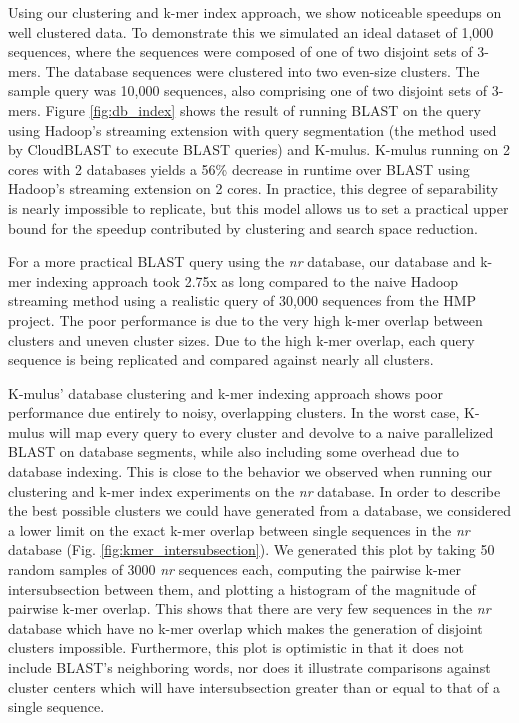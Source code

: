 Using our clustering and k-mer index approach, we show noticeable speedups on well clustered data.
To demonstrate this we simulated an ideal dataset of 1,000 sequences, where the sequences were composed of one of two disjoint sets of 3-mers.
The database sequences were clustered into two even-size clusters.
The sample query was 10,000 sequences, also comprising one of two disjoint sets of 3-mers.
Figure \ref{fig:db_index} shows the result of running BLAST on the query using Hadoop's streaming extension with query segmentation (the method used by CloudBLAST to execute BLAST queries) and K-mulus.
K-mulus running on 2 cores with 2 databases yields a 56\% decrease in runtime over BLAST using Hadoop's streaming extension on 2 cores.
In practice, this degree of separability is nearly impossible to replicate, but this model allows us to set a practical upper bound for the speedup contributed by clustering and search space reduction.

For a more practical BLAST query using the \emph{nr} database, our database and k-mer indexing approach took 2.75x as long compared to the naive Hadoop streaming method using a realistic query of 30,000 sequences from the HMP project. The poor performance is due to the very high k-mer overlap between clusters and uneven cluster sizes.
Due to the high k-mer overlap, each query sequence is being replicated and compared against nearly all clusters.

K-mulus' database clustering and k-mer indexing approach shows poor performance due entirely to noisy, overlapping clusters. In the worst case, K-mulus will map every query to every cluster and devolve to a naive parallelized BLAST on database segments, while also including some overhead due to database indexing. This is close to the behavior we observed when running our clustering and k-mer index experiments on the \emph{nr} database. In order to describe the best possible clusters we could have generated from a database, we considered a lower limit on the exact k-mer overlap between single sequences in the \emph{nr} database (Fig. \ref{fig:kmer_intersubsection}). We generated this plot by taking 50 random samples of 3000 \emph{nr} sequences each, computing the pairwise k-mer intersubsection between them, and plotting a histogram of the magnitude of pairwise k-mer overlap. This shows that there are very few sequences in the \emph{nr} database which have no k-mer overlap which makes the generation of disjoint clusters impossible. Furthermore, this plot is optimistic in that it does not include BLAST’s neighboring words, nor does it illustrate comparisons against cluster centers which will have intersubsection greater than or equal to that of a single sequence.

